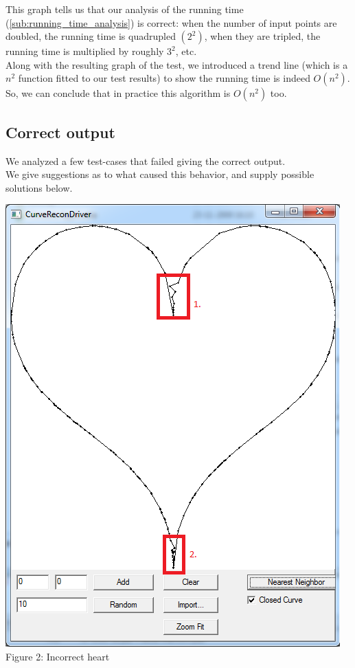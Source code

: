     \noindent This graph tells us that our analysis of the running time (\ref{sub:running_time_analysis}) is correct: when the number of input points are doubled, the running time is quadrupled $(2^2)$, when they are tripled, the running time is multiplied by roughly $3^2$, etc.\\
    Along with the resulting graph of the test, we introduced a trend line (which is a $n^2$ function fitted to our test results) to show the running time is indeed $O(n^2)$.\\
    So, we can conclude that in practice this algorithm is $O(n^2)$ too.

    \subsection{Correct output}
    We analyzed a few test-cases that failed giving the correct output.\\
    We give suggestions as to what caused this behavior, and supply possible solutions below.\\

    \begin{center}
      \includegraphics[scale = 0.6]{1NearestNeighbor/nnHeartgraph.png}\\
      Figure 2: Incorrect heart
    \end{center}

